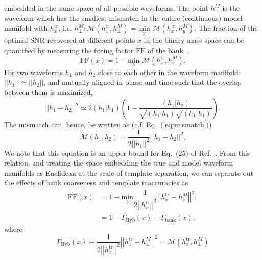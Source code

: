 \documentclass[aps,
prd,
twocolumn,
superscriptaddress,
lengthcheck,showpacs,letterpaper,nofootinbib,
floatfix]{revtex4-1}
\newcommand{\M}{\mathit{M}}
\newcommand{\bnk}{\mathrm{bank}}
\newcommand{\mn}{\mathrm{min}}
\newcommand{\tr}{\mathrm{tr}}
\newcommand{\Hyb}{\mathrm{Hyb}}
\newcommand{\leftn}{\left|\left|}
\newcommand{\rightn}{\right|\right|}
\newcommand{\Mis}{\mathcal{M}}
\newcommand{\FF}{\mathrm{FF}}
\def\l({\left(}
\def\r){\right)}
\begin{document}
embedded in the same space of all possible waveforms. The 
point $h^\M_\perp$ is the waveform which has the smallest mismatch
in the entire (continuous) model manifold with $h^\tr_x$, i.e.
$h^\M_\perp :\mathcal{M}(h^\tr_x,h^\M_\perp) = \underset{y}{\mn}\,\,\mathcal{M}(h^\tr_x,h^\M_y)$.
The fraction of the optimal SNR recovered at different points $x$ in the
binary mass space can be quantified by measuring the fitting factor $\FF$ of
the bank~\cite{FittingFactorApostolatos},
\begin{equation}\label{eq:ffmismatch}
 \FF(x) = 1 - \underset{b}{\mn}\,\,\mathcal{M}(h^\tr_x, h^\M_b).
\end{equation}
For two waveforms $h_1$ and $h_2$ close to each other in the
waveform manifold: $\leftn h_1\rightn \simeq\leftn h_2\rightn$, and mutually
aligned in phase and time such that the overlap between them is maximized, 
\begin{equation}
  \leftn h_1 - h_2\rightn^2 \simeq 2\l( h_1 |h_1\r)\left(1 - \dfrac{\l( h_1 |h_2\r)}{\sqrt{\l( h_1 |h_1\r)}\sqrt{\l( h_1 |h_1\r)}}\right).
\end{equation}
The mismatch can, hence, be written as 
(c.f. Eq.~(\ref{eq:mismatch}))
\begin{equation}
 \Mis\left(h_1,h_2\right) = \dfrac{1}{2\leftn h_1\rightn^2}\leftn h_1 - 
h_2\rightn^2.
\end{equation}
We note that this equation is an upper bound for Eq.~(25) of
Ref.~\cite{Cannon:2012gq}. 
From this relation, and treating the space embedding the true and model 
waveform manifolds as Euclidean at the scale of template separation, we
can separate out the effects of bank coarseness and template inaccuracies as
\begin{subequations}
\begin{align}
 \FF(x) &= 1 - \underset{b}{\mn}\dfrac{1}{2\leftn h^\tr_x\rightn^2}\leftn h^\tr_x - h^\M_b\rightn^2 ,\\
 &= 1 - \Gamma_\Hyb(x) - \Gamma_\bnk(x)\label{eq:FFGammas};
 \end{align}
\end{subequations}
where 
\begin{equation}
\Gamma_\Hyb(x) \equiv \dfrac{1}{2\leftn h^\tr_x\rightn^2}\leftn h^\tr_x - h^\M_\perp\rightn^2 = \mathcal{M}(h^\tr_x,h^\M_\perp) 
\end{equation}
\end{document}
